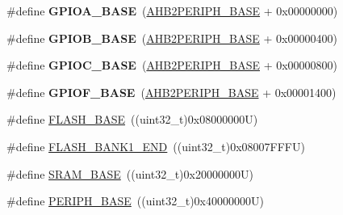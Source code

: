 \begin{DoxyCompactItemize}
\item 
\mbox{\label{group___peripheral__memory__map_gad7723846cc5db8e43a44d78cf21f6efa}} 
\#define {\bfseries G\+P\+I\+O\+A\+\_\+\+B\+A\+SE}~(\hyperlink{group___peripheral__memory__map_gaeedaa71d22a1948492365e2cd26cfd46}{A\+H\+B2\+P\+E\+R\+I\+P\+H\+\_\+\+B\+A\+SE} + 0x00000000)
\item 
\mbox{\label{group___peripheral__memory__map_gac944a89eb789000ece920c0f89cb6a68}} 
\#define {\bfseries G\+P\+I\+O\+B\+\_\+\+B\+A\+SE}~(\hyperlink{group___peripheral__memory__map_gaeedaa71d22a1948492365e2cd26cfd46}{A\+H\+B2\+P\+E\+R\+I\+P\+H\+\_\+\+B\+A\+SE} + 0x00000400)
\item 
\mbox{\label{group___peripheral__memory__map_ga26f267dc35338eef219544c51f1e6b3f}} 
\#define {\bfseries G\+P\+I\+O\+C\+\_\+\+B\+A\+SE}~(\hyperlink{group___peripheral__memory__map_gaeedaa71d22a1948492365e2cd26cfd46}{A\+H\+B2\+P\+E\+R\+I\+P\+H\+\_\+\+B\+A\+SE} + 0x00000800)
\item 
\mbox{\label{group___peripheral__memory__map_ga7f9a3f4223a1a784af464a114978d26e}} 
\#define {\bfseries G\+P\+I\+O\+F\+\_\+\+B\+A\+SE}~(\hyperlink{group___peripheral__memory__map_gaeedaa71d22a1948492365e2cd26cfd46}{A\+H\+B2\+P\+E\+R\+I\+P\+H\+\_\+\+B\+A\+SE} + 0x00001400)
\item 
\#define \hyperlink{group___peripheral__memory__map_ga23a9099a5f8fc9c6e253c0eecb2be8db}{F\+L\+A\+S\+H\+\_\+\+B\+A\+SE}~((uint32\+\_\+t)0x08000000\+U)
\item 
\#define \hyperlink{group___peripheral__memory__map_ga443a2786535d83e32dfdc2b29e379332}{F\+L\+A\+S\+H\+\_\+\+B\+A\+N\+K1\+\_\+\+E\+ND}~((uint32\+\_\+t)0x08007\+F\+F\+F\+U)
\item 
\#define \hyperlink{group___peripheral__memory__map_ga05e8f3d2e5868754a7cd88614955aecc}{S\+R\+A\+M\+\_\+\+B\+A\+SE}~((uint32\+\_\+t)0x20000000\+U)
\item 
\#define \hyperlink{group___peripheral__memory__map_ga9171f49478fa86d932f89e78e73b88b0}{P\+E\+R\+I\+P\+H\+\_\+\+B\+A\+SE}~((uint32\+\_\+t)0x40000000\+U)
\item 
\mbox{\label{group___peripheral__memory__map_gac85f31889eb6a3f651b563bbc7131f91}} 

\end{DoxyCompactItemize}
